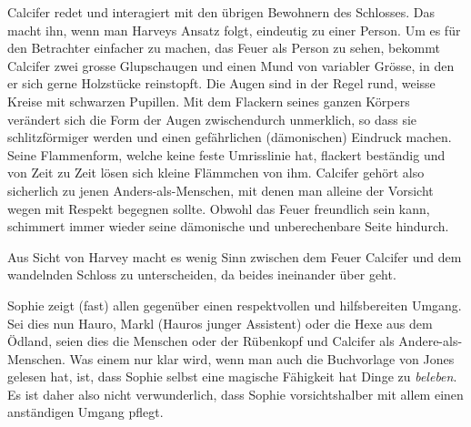 Calcifer redet und interagiert mit den übrigen Bewohnern des Schlosses. Das macht ihn, wenn man Harveys Ansatz folgt, eindeutig zu einer Person. Um es für den Betrachter einfacher zu machen, das Feuer als Person zu sehen, bekommt Calcifer zwei grosse Glupschaugen und einen Mund von variabler Grösse, in den er sich gerne Holzstücke reinstopft. Die Augen sind in der Regel rund, weisse Kreise mit schwarzen Pupillen. Mit dem Flackern seines ganzen Körpers verändert sich die Form der Augen zwischendurch unmerklich, so dass sie schlitzförmiger werden und einen gefährlichen (dämonischen) Eindruck machen. Seine Flammenform, welche keine feste Umrisslinie hat, flackert beständig und von Zeit zu Zeit lösen sich kleine Flämmchen von ihm. Calcifer gehört also sicherlich zu jenen Anders-als-Menschen, mit denen man alleine der Vorsicht wegen mit Respekt begegnen sollte. Obwohl das Feuer freundlich sein kann, schimmert immer wieder seine dämonische und unberechenbare Seite hindurch. 

Aus Sicht von Harvey macht es wenig Sinn zwischen dem Feuer Calcifer und dem wandelnden Schloss zu unterscheiden, da beides ineinander über geht. 

Sophie zeigt (fast) allen gegenüber einen respektvollen und hilfsbereiten Umgang. Sei dies nun Hauro, Markl (Hauros junger Assistent) oder die Hexe aus dem Ödland,  seien dies die Menschen oder der Rübenkopf und Calcifer als Andere-als-Menschen. Was einem nur klar wird, wenn man auch die Buchvorlage von Jones gelesen hat, ist, dass Sophie selbst eine magische Fähigkeit hat Dinge zu \emph{beleben}. Es ist daher also nicht verwunderlich, dass Sophie vorsichtshalber mit allem einen anständigen Umgang pflegt. 

